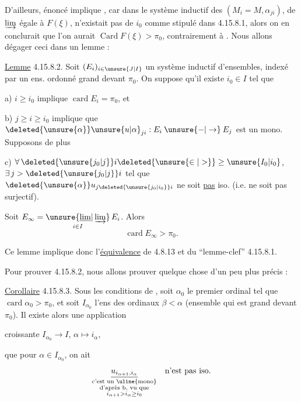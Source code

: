 D'ailleurs, énoncé  implique , car dans le système inductif des $(M_i=M,\alpha_{ji})$, de $\varinjlim$ égale à $F(\xi)$,  n'existait pas de $i_0$ comme stipulé dans
4.15.8.1, alors on en conclurait  que l'on aurait $\operatorname{Card} F(\xi)>\pi_0$, contrairement à . Nous allons dégager ceci dans un lemme :

\uline{Lemme} 4.15.8.2. Soit $(E_i)_{i\in\unsure{J|I}}$ un système inductif d'ensembles, indexé par un ens. ordonné  grand devant $\pi_0$. On suppose qu'il existe $i_0\in I$ tel que

a) $i\geq i_0$ implique $\operatorname{card} E_i=\pi_0$, et

b) $j\geq i\geq i_0$ implique que $\deleted{\unsure{\alpha}}\unsure{u|\alpha}_{ji}:E_i\mathbin{\unsure{-|\to}} E_j$ est un mono. Supposons de plus

c) $\forall\,\deleted{\unsure{j_0|j}}i\deleted{\unsure{\in|>}}\geq \unsure{I_0|i_0}$, $\exists\, j>\deleted{\unsure{j_0|j}}i$ tel que $\deleted{\unsure{\alpha}}u_{j\deleted{\unsure{j_0|i_0}}i}$ ne soit \uline{pas} iso. (i.e. ne soit pas surjectif).

 Soit $E_\infty=\underset{i\in I}{\unsure{\underline{\lim}|\varinjlim}}\,E_i$. Alors
\[
\operatorname{card} E_\infty>\pi_0.
\]

Ce lemme implique donc l'\uline{équivalence} de 4.8.13 et du ``lemme-clef'' 4.15.8.1.

Pour prouver 4.15.8.2, nous allons prouver quelque chose d'un peu plus précis :

\uline{Corollaire} 4.15.8.3. Sous les conditions de , soit $\alpha_0$ le premier ordinal tel que $\operatorname{card}\alpha_0>\pi_0$, et soit $I_{\alpha_0}$ l'ens des ordinaux $\beta<\alpha$ (ensemble  qui est grand devant $\pi_0$). Il existe alors une application

 croissante $I_{\alpha_0}\longrightarrow I$, $\alpha\longmapsto i_\alpha$, 

 que   pour  $\alpha\in I_{\alpha_0}$, on ait
\[
\underset{\substack{\text{c'est un \uline{mono}}\\\text{d'après b, vu que}\\i_{\alpha+1}>i_\alpha\geq i_0}}{\underline{u_{i_{\alpha+1},i_\alpha}}}\quad\text{n'est pas iso.}
\]

